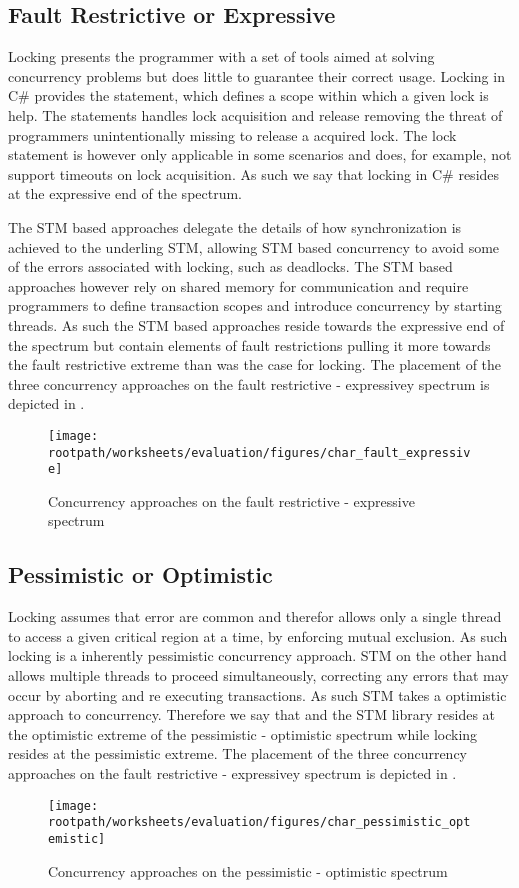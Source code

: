 \subsection{Fault Restrictive or Expressive}
Locking presents the programmer with a set of tools aimed at solving concurrency problems but does little to guarantee their correct usage. Locking in C\# provides the  statement\cite[p. 102]{csharp2013specificaiton}, which defines a scope within which a given lock is help. The  statements handles lock acquisition and release removing the threat of programmers unintentionally missing to release a acquired lock. The lock statement is however only applicable in some scenarios and does, for example, not support timeouts on lock acquisition. As such we say that locking in C\# resides at the expressive end of the spectrum.

The \ac{STM} based approaches delegate the details of how synchronization is achieved to the underling \ac{STM}, allowing \ac{STM} based concurrency to avoid some of the errors associated with locking, such as deadlocks. The \ac{STM} based approaches however rely on shared memory for communication and require programmers to define transaction scopes and introduce concurrency by starting threads. As such the \ac{STM} based approaches reside towards the expressive end of the spectrum but contain elements of fault restrictions pulling it more towards the fault restrictive extreme than was the case for locking. The placement of the three concurrency approaches on the fault restrictive - expressivey spectrum is depicted in . 
\begin{figure}[htbp]
\centering
 \texttt{[image: \\rootpath/worksheets/evaluation/figures/char\_fault\_expressive]} 
 \caption{Concurrency approaches on the fault restrictive - expressive spectrum}
\label{fig:char_fault_expressive}
\end{figure}

\subsection{Pessimistic or Optimistic}
Locking assumes that error are common and therefor allows only a single thread to access a given critical region at a time, by enforcing mutual exclusion. As such locking is a inherently pessimistic concurrency approach. \ac{STM} on the other hand allows multiple threads to proceed simultaneously, correcting any errors that may occur by aborting and re executing transactions. As such \ac{STM} takes a optimistic approach to concurrency.
Therefore we say that \stmnamesp and the \ac{STM} library resides at the optimistic extreme of the pessimistic - optimistic spectrum while locking resides at the pessimistic extreme. The placement of the three concurrency approaches on the fault restrictive - expressivey spectrum is depicted in . 
\begin{figure}[htbp]
\centering
 \texttt{[image: \\rootpath/worksheets/evaluation/figures/char\_pessimistic\_optemistic]} 
 \caption{Concurrency approaches on the pessimistic - optimistic spectrum}
\label{fig:char_pes_opti}
\end{figure}

